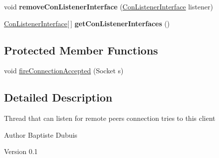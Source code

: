 \begin{DoxyCompactItemize}
\item 
\hypertarget{classj_bittorrent_a_p_i_1_1_connection_listener_adb8f0383f4d751fe51d999500566c7c5}{
void {\bfseries removeConListenerInterface} (\hyperlink{interfacej_bittorrent_a_p_i_1_1_con_listener_interface}{ConListenerInterface} listener)}
\label{classj_bittorrent_a_p_i_1_1_connection_listener_adb8f0383f4d751fe51d999500566c7c5}

\item 
\hypertarget{classj_bittorrent_a_p_i_1_1_connection_listener_a899e3b430c6168af1e1f5368face538f}{
\hyperlink{interfacej_bittorrent_a_p_i_1_1_con_listener_interface}{ConListenerInterface}\mbox{[}$\,$\mbox{]} {\bfseries getConListenerInterfaces} ()}
\label{classj_bittorrent_a_p_i_1_1_connection_listener_a899e3b430c6168af1e1f5368face538f}

\end{DoxyCompactItemize}
\subsection*{Protected Member Functions}
\begin{DoxyCompactItemize}
\item 
void \hyperlink{classj_bittorrent_a_p_i_1_1_connection_listener_aca6fadfba821799d0c47ca04fee3e963}{fireConnectionAccepted} (Socket s)
\end{DoxyCompactItemize}


\subsection{Detailed Description}
Thread that can listen for remote peers connection tries to this client

\begin{DoxyAuthor}{Author}
Baptiste Dubuis 
\end{DoxyAuthor}
\begin{DoxyVersion}{Version}
0.1 
\end{DoxyVersion}



